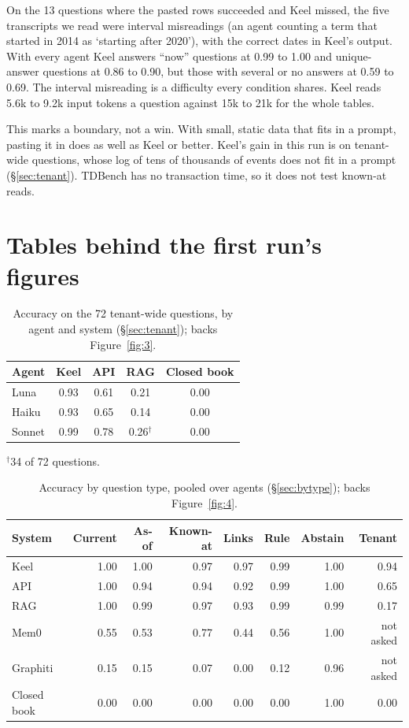 \documentclass[sigconf, nonacm]{acmart}
\begin{document}
On the 13 questions where the pasted rows succeeded and Keel missed, the five transcripts we read were interval misreadings (an agent counting a term that started in 2014 as `starting after 2020'), with the correct dates in Keel's output. With every agent Keel answers ``now'' questions at 0.99 to 1.00 and unique-answer questions at 0.86 to 0.90, but those with several or no answers at 0.59 to 0.69. The interval misreading is a difficulty every condition shares. Keel reads 5.6k to 9.2k input tokens a question against 15k to 21k for the whole tables.

This marks a boundary, not a win. With small, static data that fits in a prompt, pasting it in does as well as Keel or better. Keel's gain in this run is on tenant-wide questions, whose log of tens of thousands of events does not fit in a prompt (\S\ref{sec:tenant}). TDBench has no transaction time, so it does not test known-at reads.

\section{Tables behind the first run's figures}
\label{app:tables}
\setcounter{table}{0}

\begin{table}[t]
\caption{Accuracy on the 72 tenant-wide questions, by agent and system (\S\ref{sec:tenant}); backs Figure~\ref{fig:3}.}
\label{tab:b1}
\centering
\small
\begin{tabular}{l c c c c}
\toprule
Agent & Keel & API & RAG & Closed book \\
\midrule
Luna & 0.93 & 0.61 & 0.21 & 0.00 \\
Haiku & 0.93 & 0.65 & 0.14 & 0.00 \\
Sonnet & 0.99 & 0.78 & 0.26$^\dagger$ & 0.00 \\
\bottomrule
\end{tabular}

\smallskip
{\footnotesize $^\dagger$34 of 72 questions.}
\end{table}

\begin{table}[t]
\caption{Accuracy by question type, pooled over agents (\S\ref{sec:bytype}); backs Figure~\ref{fig:4}.}
\label{tab:b2}
\centering
\small
\begin{tabular}{l r r r r r r r}
\toprule
System & Current & As-of & Known-at & Links & Rule & Abstain & Tenant \\
\midrule
Keel & 1.00 & 1.00 & 0.97 & 0.97 & 0.99 & 1.00 & 0.94 \\
API & 1.00 & 0.94 & 0.94 & 0.92 & 0.99 & 1.00 & 0.65 \\
RAG & 1.00 & 0.99 & 0.97 & 0.93 & 0.99 & 0.99 & 0.17 \\
Mem0 & 0.55 & 0.53 & 0.77 & 0.44 & 0.56 & 1.00 & not asked \\
Graphiti & 0.15 & 0.15 & 0.07 & 0.00 & 0.12 & 0.96 & not asked \\
Closed book & 0.00 & 0.00 & 0.00 & 0.00 & 0.00 & 1.00 & 0.00 \\
\bottomrule
\end{tabular}
\end{table}
\end{document}
